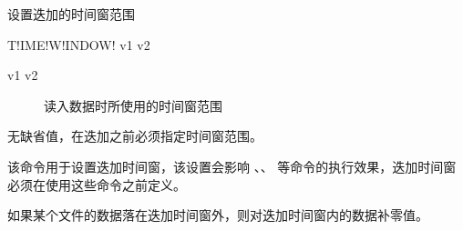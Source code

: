 \label{sss:timewindow}

设置迭加的时间窗范围

\begin{SACSTX}
T!IME!W!INDOW! v1 v2
\end{SACSTX}

\begin{description}
\item [v1 v2] 读入数据时所使用的时间窗范围
\end{description}

无缺省值，在迭加之前必须指定时间窗范围。

该命令用于设置迭加时间窗，该设置会影响 、、 等命令的执行效果，迭加时间窗必须在使用这些命令之前定义。

如果某个文件的数据落在迭加时间窗外，则对迭加时间窗内的数据补零值。
